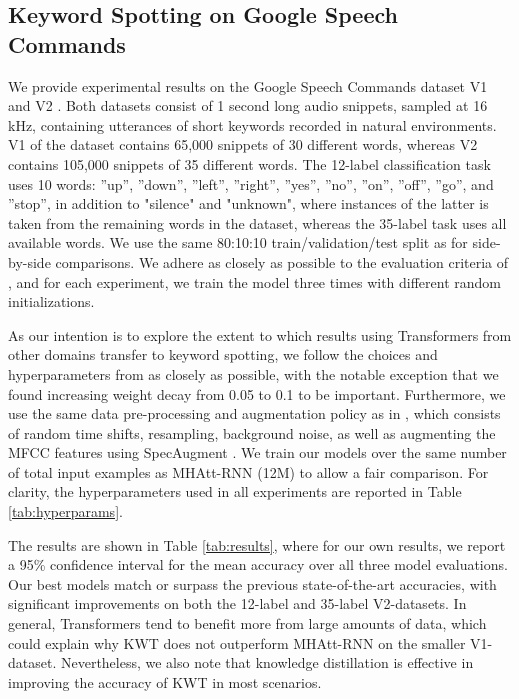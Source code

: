 \documentclass[a4paper]{article}
\begin{document}
\subsection{Keyword Spotting on Google Speech Commands}

We provide experimental results on the Google Speech Commands dataset V1 and V2 \cite{warden2018speech}. Both datasets consist of 1 second long audio snippets, sampled at 16 kHz, containing utterances of short keywords recorded in natural environments. V1 of the dataset contains 65,000 snippets of 30 different words, whereas V2 contains 105,000 snippets of 35 different words. The 12-label classification task uses 10 words:  ”up”, ”down”, ”left”, ”right”, ”yes”, ”no”, ”on”, ”off”, ”go”, and ”stop”, in addition to "silence" and "unknown", where instances of the latter is taken from the remaining words in the dataset, whereas the 35-label task uses all available words. We use the same 80:10:10 train/validation/test split as \cite{warden2018speech, zhang2017hello, rybakov2020streaming} for side-by-side comparisons. We adhere as closely as possible to the evaluation criteria of \cite{rybakov2020streaming}, and for each experiment, we train the model three times with different random initializations. 

As our intention is to explore the extent to which results using Transformers from other domains transfer to keyword spotting, we follow the choices and hyperparameters from \cite{touvron2020training} as closely as possible, with the notable exception that we found increasing weight decay from 0.05 to 0.1 to be important. Furthermore, we use the same data pre-processing and augmentation policy as in \cite{rybakov2020streaming}, which consists of random time shifts, resampling, background noise, as well as augmenting the MFCC features using SpecAugment \cite{park2019specaugment}. We train our models over the same number of total input examples as MHAtt-RNN (12M) to allow a fair comparison. For clarity, the hyperparameters used in all experiments are reported in Table \ref{tab:hyperparams}.

The results are shown in Table \ref{tab:results}, where for our own results, we report a 95\% confidence interval for the mean accuracy over all three model evaluations. Our best models match or surpass the previous state-of-the-art accuracies, with significant improvements on both the 12-label and 35-label V2-datasets. In general, Transformers tend to benefit more from large amounts of data, which could explain why KWT does not outperform MHAtt-RNN on the smaller V1-dataset. Nevertheless, we also note that knowledge distillation is effective in improving the accuracy of KWT in most scenarios.
\end{document}
